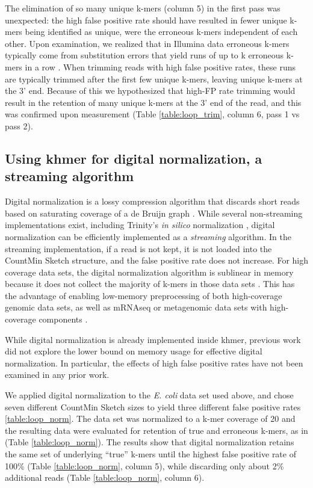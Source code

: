 \documentclass[10pt]{article}
\begin{document}
The elimination of so many unique k-mers (column 5) in the first pass
was unexpected: the high false positive rate should have resulted in
fewer unique k-mers being identified as unique, were the erroneous
k-mers independent of each other. Upon examination, we realized that
in Illumina data erroneous k-mers typically come from substitution
errors that yield runs of up to k erroneous k-mers in a row
\cite{Kelley2010}.  When trimming reads with high false positive
rates, these runs are typically trimmed after the first few unique
k-mers, leaving unique k-mers at the 3' end.  Because of this we
hypothesized that high-FP rate trimming would result in the retention
of many unique k-mers at the 3' end of the read, and this was
confirmed upon measurement (Table \ref{table:loop_trim}, column 6,
pass 1 vs pass 2).

\subsection*{Using khmer for digital normalization, a streaming algorithm}

Digital normalization is a lossy compression algorithm that discards
short reads based on saturating coverage of a de Bruijn graph
\cite{Brown2012}.  While several non-streaming implementations exist,
including Trinity's {\em in silico} normalization
\cite{Haas2013,Brown2012blog}, digital normalization can be
efficiently implemented as a {\em streaming} algorithm. In the
streaming implementation, if a read is not kept, it is not loaded into
the CountMin Sketch structure, and the false positive rate does not
increase.  For high coverage data sets, the digital normalization
algorithm is sublinear in memory because it does not collect the
majority of k-mers in those data sets \cite{Brown2012}.  This has the
advantage of enabling low-memory preprocessing of both high-coverage
genomic data sets, as well as mRNAseq or metagenomic data sets with
high-coverage components \cite{Brown2012, Howe2012}.

While digital normalization is already implemented inside khmer,
previous work did not explore the lower bound on memory usage for
effective digital normalization.  In particular, the effects of high
false positive rates have not been examined in any prior work.

We applied digital normalization to the {\em E. coli} data set used
above, and chose seven different CountMin Sketch sizes to yield three
different false positive rates \ref{table:loop_norm}.  The data set
was normalized to a k-mer coverage of 20 and the resulting data were
evaluated for retention of true and erroneous k-mers, as in
\cite{Brown2012} (Table \ref{table:loop_norm}).  The results show that
digital normalization retains the same set of underlying ``true''
k-mers until the highest false positive rate of 100\% (Table
\ref{table:loop_norm}, column 5), while discarding only about 2\%
additional reads (Table \ref{table:loop_norm}, column 6).
\end{document}
